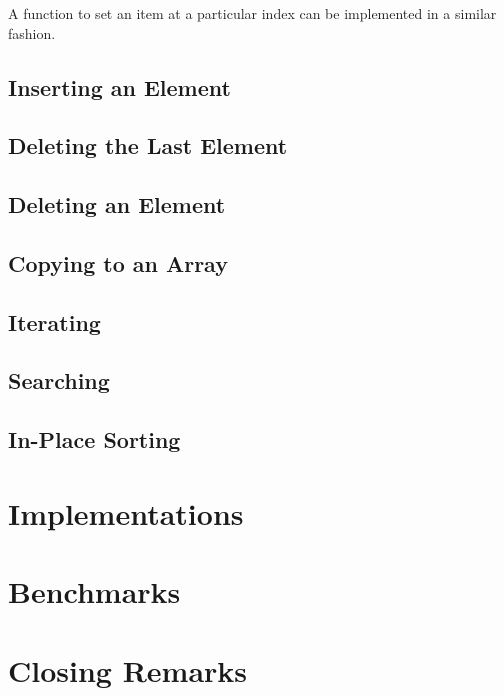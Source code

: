 \documentclass{article}
\begin{document}
	A function to set an item at a particular index can be implemented in a similar fashion.
	
	\subsection{Inserting an Element}
	
	\subsection{Deleting the Last Element}
	
	\subsection{Deleting an Element}
	
	\subsection{Copying to an Array}
	
	\subsection{Iterating}
	
	\subsection{Searching}
	
	\subsection{In-Place Sorting}
	
	\section{Implementations}
	\label{Implementations}
	
	\section{Benchmarks}
	\label{Benchmarks}
	
	\section{Closing Remarks}
	\label{Closing Remarks}
	
\end{document}
